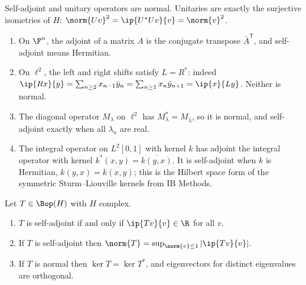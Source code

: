 Self-adjoint and unitary operators are normal. Unitaries are exactly the surjective isometries of $H$: $\norm{Uv}^2 = \ip{U^*Uv}{v}=\norm{v}^2$.

\begin{example}
	\begin{enumerate}[label=(\roman*)]
		\item On $\F^n$, the adjoint of a matrix $A$ is the conjugate transpose $\bar A^{\mathsf T}$, and self-adjoint means Hermitian.
		\item On $\ell^2$, the left and right shifts satisfy $L = R^*$: indeed $\ip{Rx}{y} = \sum_{n\geq2}x_{n-1}\bar y_n = \sum_{n\geq1}x_n \bar y_{n+1}=\ip{x}{Ly}$. Neither is normal.
		\item The diagonal operator $M_\lambda$ on $\ell^2$ has $M_\lambda^* = M_{\bar\lambda}$, so it is normal, and self-adjoint exactly when all $\lambda_n$ are real.
		\item The integral operator on $L^2[0,1]$ with kernel $k$ has adjoint the integral operator with kernel $k^*(x,y)=\overline{k(y,x)}$. It is self-adjoint when $k$ is Hermitian, $k(y,x)=\overline{k(x,y)}$; this is the Hilbert space form of the symmetric Sturm--Liouville kernels from IB Methods.
	\end{enumerate}
\end{example}

\begin{proposition}
	Let $T \in \Bop(H)$ with $H$ complex.
	\begin{enumerate}[label=(\roman*)]
		\item $T$ is self-adjoint if and only if $\ip{Tv}{v}\in\R$ for all $v$.
		\item If $T$ is self-adjoint then $\norm{T} = \sup_{\norm{v}\leq1}|\ip{Tv}{v}|$.
		\item If $T$ is normal then $\ker T = \ker T^*$, and eigenvectors for distinct eigenvalues are orthogonal.
	\end{enumerate}
\end{proposition}

